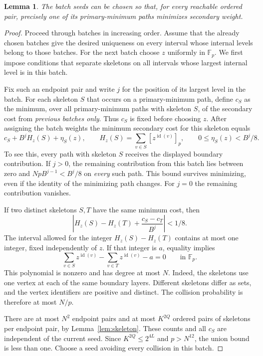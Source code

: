 \documentclass[11pt]{article}
\newtheorem{lemma}[theorem]{Lemma}
\newcommand{\F}{\mathbb F}
\begin{document}
\begin{lemma}\label{lem:shift}
The batch seeds can be chosen so that, for every reachable ordered pair, precisely one of its primary-minimum paths minimizes secondary weight.
\end{lemma}
\begin{proof}
Proceed through batches in increasing order. Assume that the already chosen batches give the desired uniqueness on every interval whose internal levels belong to those batches. For the next batch choose $z$ uniformly in $\F_p$. We first impose conditions that separate skeletons on all intervals whose largest internal level is in this batch.

Fix such an endpoint pair and write $j$ for the position of its largest level in the batch. For each skeleton $S$ that occurs on a primary-minimum path, define $c_S$ as the minimum, over all primary-minimum paths with skeleton $S$, of the secondary cost from \emph{previous batches only}. Thus $c_S$ is fixed before choosing $z$. After assigning the batch weights the minimum secondary cost for this skeleton equals
\begin{equation}\label{eq:cost}
     c_S+B^j H_z(S)+\eta_S(z),\qquad
     H_z(S)=\sum_{v\in S}[z^{\operatorname{id}(v)}]_p,\qquad
     0\le\eta_S(z)<B^j/8 .
\end{equation}
To see this, every path with skeleton $S$ receives the displayed boundary contribution. If $j>0$, the remaining contribution from this batch lies between zero and $NpB^{j-1}<B^j/8$ on \emph{every} such path. This bound survives minimizing, even if the identity of the minimizing path changes. For $j=0$ the remaining contribution vanishes.

If two distinct skeletons $S,T$ have the same minimum cost, then
\[
 \left|H_z(S)-H_z(T)+\frac{c_S-c_T}{B^j}\right|<1/8.
\]
The interval allowed for the integer $H_z(S)-H_z(T)$ contains at most one integer, fixed independently of $z$. If that integer is $a$, equality implies
\[
    \sum_{v\in S}z^{\operatorname{id}(v)}
    -\sum_{v\in T}z^{\operatorname{id}(v)}-a=0\qquad\text{in }\F_p .
\]
This polynomial is nonzero and has degree at most $N$. Indeed, the skeletons use one vertex at each of the same boundary layers. Different skeletons differ as sets, and the vertex identifiers are positive and distinct. The collision probability is therefore at most $N/p$.

There are at most $N^2$ endpoint pairs and at most $K^{2Q}$ ordered pairs of skeletons per endpoint pair, by Lemma~\ref{lem:skeleton}. These counts and all $c_S$ are independent of the current seed. Since $K^{2Q}\le2^{4L}$ and $p>N^{12}$, the union bound is less than one. Choose a seed avoiding every collision in this batch.


\end{proof}
\end{document}
